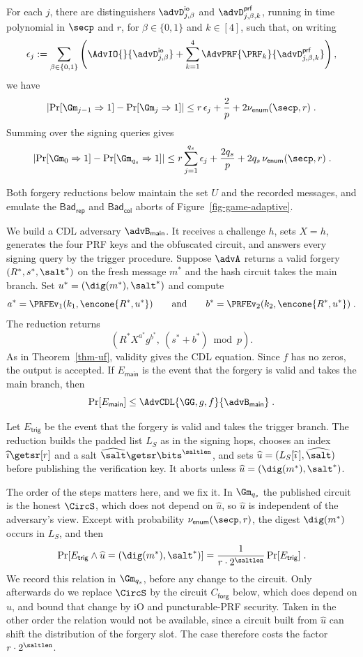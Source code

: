 For each $j$, there are distinguishers $\advD^{\mathsf{io}}_{j,\beta}$ and $\advD^{\mathsf{prf}}_{j,\beta,k}$, running in time polynomial in $\secp$ and $r$, for $\beta\in\{0,1\}$ and $k\in[4]$, such that, on writing
$$
\epsilon_j
:=
\sum_{\beta\in\{0,1\}}
\left(
\AdvIO{}{\advD^{\mathsf{io}}_{j,\beta}}
+\sum_{k=1}^4
\AdvPRF{\PRF_k}{\advD^{\mathsf{prf}}_{j,\beta,k}}
\right),
$$
we have
$$
\left|\Pr[\Gm_{j-1}\Rightarrow1]-\Pr[\Gm_j\Rightarrow1]\right|
\le r\,\epsilon_j+\frac{2}{p}+2\nu_{\mathsf{enum}}(\secp,r) \;.
$$
Summing over the signing queries gives
$$
\left|\Pr[\Gm_0\Rightarrow1]-\Pr[\Gm_{q_s}\Rightarrow1]\right|
\le r\sum_{j=1}^{q_s}\epsilon_j+\frac{2q_s}{p}+2q_s\,\nu_{\mathsf{enum}}(\secp,r) \;.
$$

Both forgery reductions below maintain the set $U$ and the recorded messages, and emulate the $\mathsf{Bad}_{\mathsf{rep}}$ and $\mathsf{Bad}_{\mathsf{col}}$ aborts of Figure~\ref{fig-game-adaptive}.

 We build a CDL adversary $\advB_{\mathsf{main}}$. It receives a challenge $h$, sets $X=h$, generates the four PRF keys and the obfuscated circuit, and answers every signing query by the trigger procedure. Suppose $\advA$ returns a valid forgery $(R^*,s^*,\salt^*)$ on the fresh message $m^*$ and the hash circuit takes the main branch. Set $u^*=(\dig(m^*),\salt^*)$ and compute
$$
a^*=\PRFEv_1(k_1,\encone{R^*,u^*})
\qquad\text{and}\qquad
b^*=\PRFEv_2(k_2,\encone{R^*,u^*}) \;.
$$
The reduction returns
$$
\left(R^*X^{a^*}g^{b^*},\ (s^*+b^*)\bmod p\right).
$$
As in Theorem~\ref{thm-uf}, validity gives the CDL equation. Since $f$ has no zeros, the output is accepted. If $E_{\mathsf{main}}$ is the event that the forgery is valid and takes the main branch, then
$$
\Pr[E_{\mathsf{main}}]
\le \AdvCDL{\GG,g,f}{\advB_{\mathsf{main}}} \;.
$$

 Let $E_{\mathsf{trig}}$ be the event that the forgery is valid and takes the trigger branch. The reduction builds the padded list $L_S$ as in the signing hops, chooses an index $\widehat\imath \getsr [r]$ and a salt $\widehat{\salt} \getsr \bits^{\saltlen}$, and sets $\widehat u = (L_S[\widehat\imath\,], \widehat{\salt})$ before publishing the verification key. It aborts unless $\widehat u=(\dig(m^*),\salt^*)$.

The order of the steps matters here, and we fix it. In $\Gm_{q_s}$ the published circuit is the honest $\CircS$, which does not depend on $\widehat u$, so $\widehat u$ is independent of the adversary's view. Except with probability $\nu_{\mathsf{enum}}(\secp,r)$, the digest $\dig(m^*)$ occurs in $L_S$, and then
$$
\Pr[E_{\mathsf{trig}} \land \widehat u=(\dig(m^*),\salt^*)]
= \frac{1}{r\cdot2^{\saltlen}}\Pr[E_{\mathsf{trig}}] \;.
$$
We record this relation in $\Gm_{q_s}$, before any change to the circuit. Only afterwards do we replace $\CircS$ by the circuit $C_{\mathsf{forg}}$ below, which does depend on $\widehat u$, and bound that change by iO and puncturable-PRF security. Taken in the other order the relation would not be available, since a circuit built from $\widehat u$ can shift the distribution of the forgery slot. The case therefore costs the factor $r\cdot2^{\saltlen}$.

